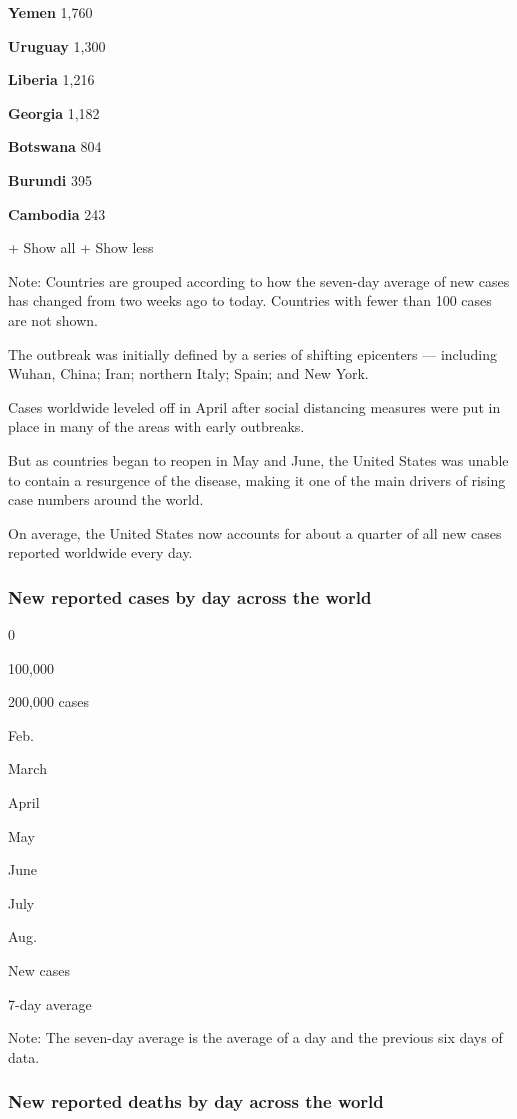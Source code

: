 \textbf{Yemen} 1,760

\textbf{Uruguay} 1,300

\textbf{Liberia} 1,216

\textbf{Georgia} 1,182

\textbf{Botswana} 804

\textbf{Burundi} 395

\textbf{Cambodia} 243

+ Show all + Show less

Note: Countries are grouped according to how the seven-day average of
new cases has changed from two weeks ago to today. Countries with fewer
than 100 cases are not shown.

The outbreak was initially defined by a series of shifting epicenters
--- including Wuhan, China; Iran; northern Italy; Spain; and New York.

Cases worldwide leveled off in April after social distancing measures
were put in place in many of the areas with early outbreaks.

But as countries began to reopen in May and June, the United States was
unable to contain a resurgence of the disease, making it one of the main
drivers of rising case numbers around the world.

On average, the United States now accounts for about a quarter of all
new cases reported worldwide every day.

\hypertarget{new-reported-cases-by-day-across-the-world}{%
\subsubsection{New reported cases by day across the
world}\label{new-reported-cases-by-day-across-the-world}}

0

100,000

200,000 cases

Feb.

March

April

May

June

July

Aug.

New cases

7-day average

Note: The seven-day average is the average of a day and the previous six
days of data.

\hypertarget{new-reported-deaths-by-day-across-the-world}{%
\subsubsection{New reported deaths by day across the
world}\label{new-reported-deaths-by-day-across-the-world}}

